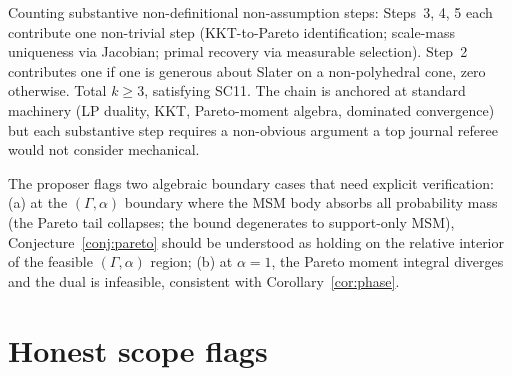 \documentclass[11pt]{article}
\theoremstyle{definition}
\theoremstyle{plain}
\theoremstyle{remark}
\begin{document}
Counting substantive non-definitional non-assumption steps: Steps~3, 4, 5 each contribute one non-trivial step (KKT-to-Pareto identification; scale-mass uniqueness via Jacobian; primal recovery via measurable selection). Step~2 contributes one if one is generous about Slater on a non-polyhedral cone, zero otherwise. Total $k\ge 3$, satisfying SC11. The chain is anchored at standard machinery (LP duality, KKT, Pareto-moment algebra, dominated convergence) but each substantive step requires a non-obvious argument a top journal referee would not consider mechanical.

The proposer flags two algebraic boundary cases that need explicit verification: (a) at the $(\Gamma, \alpha)$ boundary where the MSM body absorbs all probability mass (the Pareto tail collapses; the bound degenerates to support-only MSM), Conjecture~\ref{conj:pareto} should be understood as holding on the relative interior of the feasible $(\Gamma, \alpha)$ region; (b) at $\alpha=1$, the Pareto moment integral diverges and the dual is infeasible, consistent with Corollary~\ref{cor:phase}.

\section{Honest scope flags}
\end{document}
